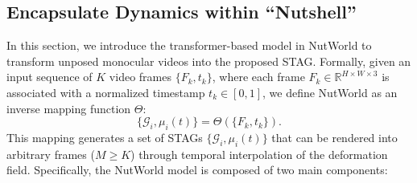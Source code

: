 \subsection{Encapsulate Dynamics within ``Nutshell''}
\label{NutShell}
In this section, we introduce the transformer-based model in NutWorld to transform unposed monocular videos into the proposed STAG. Formally, given an input sequence of $K$ video frames $\{F_{k}, t_{k} \}$, where each frame $F_{k} \in \mathbb{R}^{H \times W \times 3}$ is associated with a normalized timestamp $t_{k} \in [0, 1]$, we define NutWorld as an inverse mapping function $\Theta$:
\begin{equation}
\{\mathcal{G}_{i}, \mu_{i}(t)\} = \Theta(\{F_{k}, t_{k}\}).
\label{eq:model}
\end{equation}
This mapping generates a set of STAGs $\{\mathcal{G}_{i}, \mu_{i}(t)\}$ that can be rendered into arbitrary frames ($M \geq K$) through temporal interpolation of the deformation field. Specifically, the NutWorld model is composed of two main components:






